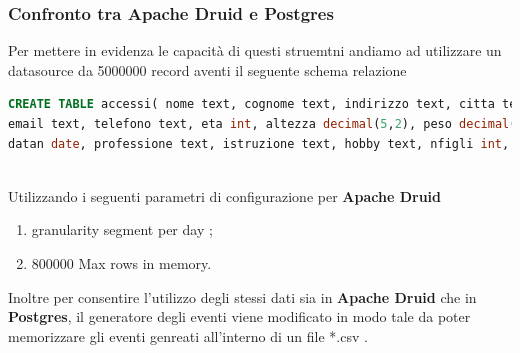 \documentclass{article}
\begin{document}
\subsubsection{Confronto tra Apache Druid e Postgres}
Per mettere in evidenza le capacità di questi struemtni andiamo ad utilizzare un datasource da 5000000 record aventi il seguente schema relazione
\begin{lstlisting}[language=SQL]
CREATE TABLE accessi( nome text, cognome text, indirizzo text, citta text, stato text, cap int, 
email text, telefono text, eta int, altezza decimal(5,2), peso decimal(5,2), reddito decimal(6,2), 
datan date, professione text, istruzione text, hobby text, nfigli int, codice_cliente int, datareg timestamp,__time timestamp);
    
\end{lstlisting}
Utilizzando i seguenti parametri di configurazione per \textbf{Apache Druid}
\begin{enumerate}
    \item granularity segment per day ;
    \item 800000 Max rows in memory.
\end{enumerate}
Inoltre per consentire l'utilizzo degli stessi dati sia in \textbf{Apache Druid} che in \textbf{Postgres},  il generatore degli eventi viene modificato in modo tale da poter memorizzare gli eventi genreati all'interno di un file *.csv  . 
\pagebreak
\end{document}
